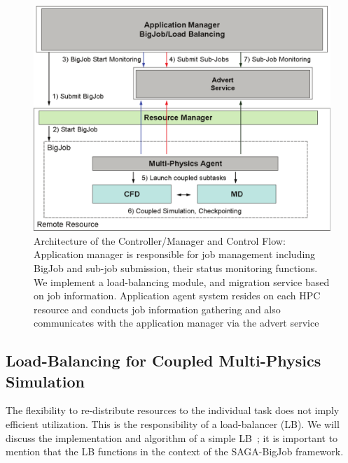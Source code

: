 \documentclass[preprint,12pt]{elsarticle}
\begin{document}
\begin{figure}
\centering
\includegraphics[width=0.8\linewidth]{Structure_of_BigJob}
\caption{\small Architecture of the Controller/Manager and Control Flow: Application manager is responsible for job management including BigJob and sub-job submission, their status monitoring functions. We implement a load-balancing module, and migration service based on job information. Application agent system resides on each HPC resource and conducts job information gathering and also communicates with the application manager via the advert service}
\label{Fig:BigJob_Structure}
\vspace{-1em}
\end{figure}


\subsection{Load-Balancing for Coupled Multi-Physics Simulation}
The flexibility to re-distribute resources to the individual task does not imply efficient utilization. This is the responsibility of a load-balancer (LB). We will discuss the implementation and algorithm of a simple LB~\cite{Ko}; it is important to mention that the LB functions in the context of the SAGA-BigJob framework.
\end{document}
